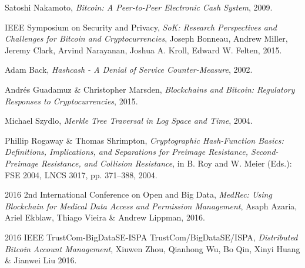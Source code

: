 %
%
%
\begin{thebibliography}{1}

  Satoshi Nakamoto,
  \emph{Bitcoin: A Peer-to-Peer Electronic Cash System},
  2009.



  IEEE Symposium on Security and Privacy,
  \emph{SoK: Research Perspectives and Challenges for Bitcoin and
Cryptocurrencies},
  Joseph Bonneau, Andrew Miller, Jeremy Clark, Arvind Narayanan, Joshua
A. Kroll, Edward W. Felten,
  2015.



  Adam Back,
  \emph{Hashcash - A Denial of Service Counter-Measure},
  2002.

  Andrés Guadamuz \& Christopher Marsden,
  \emph{Blockchains and Bitcoin: Regulatory Responses to Cryptocurrencies},
  2015.



  Michael Szydlo,
  \emph{Merkle Tree Traversal in Log Space and Time},
  2004.


  Phillip Rogaway \& Thomas Shrimpton,
  \emph{Cryptographic Hash-Function Basics: Definitions, Implications, and
Separations for Preimage Resistance, Second-Preimage Resistance, and Collision
Resistance},
  in B. Roy and W. Meier (Eds.): FSE 2004, LNCS 3017, pp. 371–388,
  2004.

  2016 2nd International Conference on Open and Big Data,
  \emph{MedRec: Using Blockchain for Medical Data Access and Permission
Management},
  Asaph Azaria, Ariel Ekblaw, Thiago Vieira \& Andrew Lippman,
  2016.

  2016 IEEE TrustCom-BigDataSE-ISPA TrustCom/BigDataSE/ISPA,
  \emph{Distributed Bitcoin Account Management},
  Xiuwen Zhou, Qianhong Wu, Bo Qin, Xinyi Huang \& Jianwei Liu
  2016.


\end{thebibliography}
